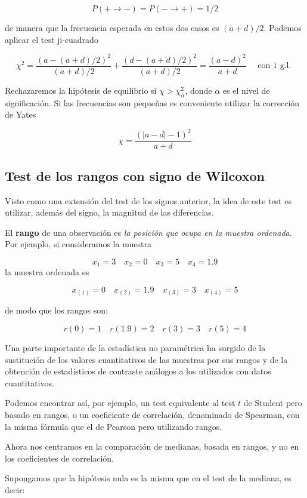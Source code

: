 \documentclass[
]{article}
\begin{document}
\[
P(+\rightarrow-)=P(-\rightarrow+)=1 / 2
\]

de manera que la frecuencia esperada en estos dos casos es \((a+d) / 2\). Podemos aplicar el test ji-cuadrado

\[
\chi^{2}=\frac{(a-(a+d) / 2)^{2}}{(a+d) / 2}+\frac{(d-(a+d) / 2)^{2}}{(a+d) / 2}=\frac{(a-d)^{2}}{a+d} \quad \text { con } 1 \text { g.l. }
\]

Rechazaremos la hipótesis de equilibrio si \(\chi>\chi_{\alpha}^{2}\), donde \(\alpha\) es el nivel de significación. Si las frecuencias son pequeñas es conveniente utilizar la corrección de Yates

\[
\chi=\frac{(|a-d|-1)^{2}}{a+d}
\]

\subsection{Test de los rangos con signo de Wilcoxon}\label{test-de-los-rangos-con-signo-de-wilcoxon}

Visto como una extensión del test de los signos anterior, la idea de este test es utilizar, además del signo, la magnitud de las diferencias.

El \textbf{rango} de una observación es \emph{la posición que ocupa en la muestra ordenada}. Por ejemplo, si consideramos la muestra

\[
x_{1}=3 \quad x_{2}=0 \quad x_{3}=5 \quad x_{4}=1.9
\]
la muestra ordenada es

\[
x_{(1)}=0 \quad x_{(2)}=1.9 \quad x_{(3)}=3 \quad x_{(4)}=5
\]

de modo que los rangos son:

\[
r(0)=1 \quad r(1.9)=2 \quad r(3)=3 \quad r(5)=4
\]

Una parte importante de la estadística no paramétrica ha surgido de la sustitución de los valores cuantitativos de las muestras por sus rangos y de la obtención de estadísticos de contraste análogos a los utilizados con datos cuantitativos.

Podemos encontrar así, por ejemplo, un test equivalente al test \(t\) de Student pero basado en rangos, o un coeficiente de correlación, denominado de Spearman, con la misma fórmula que el de Pearson pero utilizando rangos.

Ahora nos centramos en la comparación de medianas, basada en rangos, y no en los coeficientes de correlación.

Supongamos que la hipótesis nula es la misma que en el test de la mediana, es decir:
\end{document}
